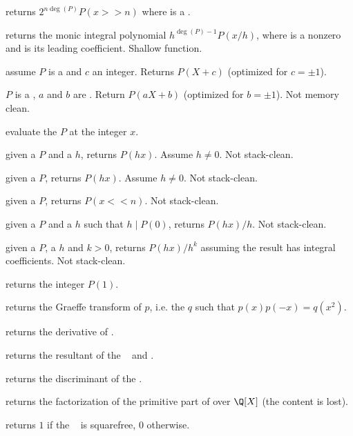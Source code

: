  returns $2^{n\deg(P)} P(x>>n)$ where
 is a .

 returns the monic integral polynomial
$h^{\deg(P)-1} P(x/h)$, where  is a nonzero  and  is
its leading coefficient. Shallow function.

 assume $P$ is a  and $c$ an
integer. Returns $P(X + c)$ (optimized for $c = \pm 1$).

 $P$ is a , $a$ and $b$
are . Return $P(aX + b)$ (optimized for $b = \pm 1$). Not memory
clean.

 evaluate the  $P$ at the integer $x$.

 given a  $P$ and a  $h$,
returns $P(hx)$. Assume $h \neq 0$. Not stack-clean.

 given a  $P$,
returns $P(hx)$. Assume $h \neq 0$. Not stack-clean.

 given a  $P$, returns
$P(x<<n)$. Not stack-clean.

 given a  $P$ and a  $h$
such that $h \mid P(0)$, returns $P(hx)/h$. Not stack-clean.

 given a  $P$,
a  $h$ and $k > 0$, returns $P(hx)/h^k$ assuming the result has
integral coefficients. Not stack-clean.

 returns the integer $P(1)$.

 returns the Graeffe transform of $p$, i.e. the
 $q$ such that $p(x)p(-x) = q(x^2)$.

 returns the derivative of .

 returns the resultant of the
~ and .

 returns the discriminant of the 
.

 returns the factorization of the primitive part
of  over $\Q[X]$ (the content is lost).

 returns $1$ if the
~ is squarefree, $0$ otherwise.

